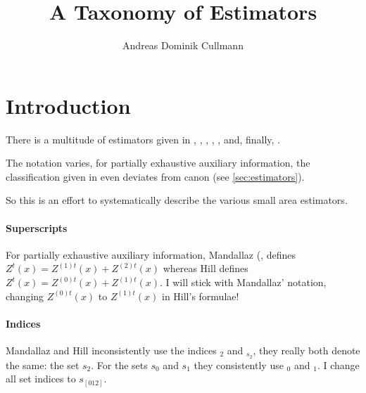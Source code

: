 \documentclass[a4paper]{article}
\title{A Taxonomy of Estimators}
\author{Andreas Dominik Cullmann}
\begin{document}
\maketitle
\providecommand{\analogy}{--}
\providecommand{\pextended}{\emph{ex}}
\providecommand{\psynthetic}{\emph{sy}}
\providecommand{\psmall}{\emph{sm}}
\providecommand{\rpack}[1]{package \texttt{#1}}
\providecommand{\rdata}[1]{\texttt{#1}}
\providecommand{\rcode}[1]{\texttt{#1}}
\providecommand{\eZ}{\mathcal{Z}}
\providecommand{\strongrule}{\midrule[2pt]}
\providecommand{\lightrule}{\midrule[0.4pt]}
\providecommand{\vR}{\frac{1}{n_{s_2,G}}\hat{V}(\hat{R}_{s_2,G}(x))}
\providecommand{\mR}{\bar{\hat{R}}_{s_2,G}(x)}
\providecommand{\vRc}{\frac{1}{n_{s_2,G}}\hat{V}(\hat{R}_{c,s_2,G}(x))}
\providecommand{\mRc}{\bar{\hat{R}}_{c,s_2,G}(x)}
\section{Introduction}


There is a multitude of estimators given in \cite{Man12a.e},
\cite{Man13a},
\cite{Man13b.e},
\cite{Man13b},
\cite{Man13c.e},
\cite{Man13c} and, finally, 
\cite{hill2017}.

The notation varies, for partially exhaustive auxiliary information, 
the classification given in \cite{hill2017}
even deviates from canon (see \ref{sec:estimators}).

So this is an effort to systematically describe the various small area
estimators.

\paragraph{Superscripts}
For partially exhaustive auxiliary information, 
Mandallaz (\cite[p.~1023]{Man13b}, \cite[p.~383f]{Man13c} defines 
$Z^t(x) = Z^{(1)t}(x)+Z^{(2)t}(x)$ 
whereas Hill \cite[p.~4 and p.~18]{hill2017} defines 
$Z^t(x) = Z^{(0)t}(x)+Z^{(1)t}(x)$.
I will stick with Mandallaz' notation, changing $Z^{(0)t}(x)$ to $Z^{(1)t}(x)$
in Hill's formulae!

\paragraph{Indices}
Mandallaz and Hill inconsistently use the indices $_2$ and $_{s_2}$,
they really both denote the same: the set
$s_2$.
For the sets $s_0$ and $s_1$ they consistently use $_0$ and $_1$.
I change all set indices to $s_{[012]}$.
\end{document}
